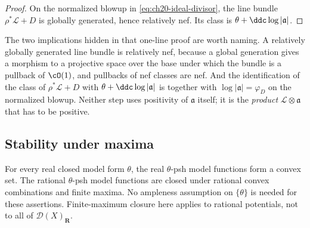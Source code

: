 \begin{proof}
On the normalized blowup in \eqref{eq:ch20-ideal-divisor}, the line bundle
$\rho^*\mathcal L+D$ is globally generated, hence relatively nef.  Its
class is $\theta+\ddc\log|\mathfrak a|$.
\end{proof}

The two implications hidden in that one-line proof are worth naming.  A
relatively globally generated line bundle is relatively nef, because a
global generation gives a morphism to a projective space over the base under
which the bundle is a pullback of $\cO(1)$, and pullbacks of nef classes
are nef.  And the identification of the class of $\rho^*\mathcal L+D$ with
$\theta+\ddc\log|\mathfrak a|$ is
 together with
$\log|\mathfrak a|=\varphi_D$ on the normalized blowup.  Neither step uses
positivity of $\mathfrak a$ itself; it is the \emph{product}
$\mathcal L\otimes\mathfrak a$ that has to be positive.

\subsection{Stability under maxima}
\label{sec:ch20-max}

\begin{proposition}\label{prop:ch20-model-max}
For every real closed model form $\theta$, the real $\theta$-psh
model functions form a convex set.  The rational $\theta$-psh model
functions are closed under rational convex combinations and finite maxima.
No ampleness assumption on $\{\theta\}$ is needed for these assertions.
Finite-maximum closure here applies to rational potentials, not to all of
$\mathcal D(X)_{\mathbf R}$.
\end{proposition}

